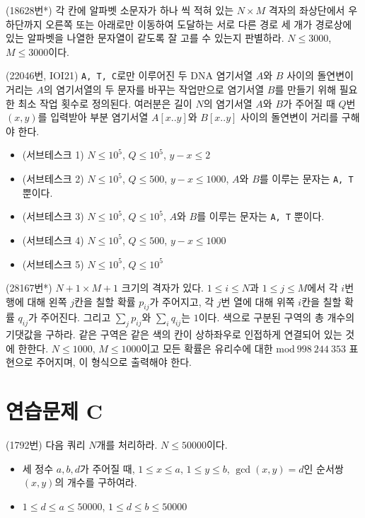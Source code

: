 \begin{problem}
    (18628번*) 각 칸에 알파벳 소문자가 하나 씩 적혀 있는 $N \times M$ 격자의 좌상단에서 우하단까지 오른쪽 또는 아래로만 이동하여 도달하는 서로 다른 경로 세 개가 경로상에 있는 알파벳을 나열한 문자열이 같도록 잘 고를 수 있는지 판별하라. $N \leq 3000$, $M \leq 3000$이다.
\end{problem}

\begin{problem}
    (22046번, IOI21) \texttt{A, T, C}로만 이루어진 두 DNA 염기서열 $A$와 $B$ 사이의 돌연변이 거리는 $A$의 염기서열의 두 문자를 바꾸는 작업만으로 염기서열 $B$를 만들기 위해 필요한 최소 작업 횟수로 정의된다. 여러분은 길이 $N$의 염기서열 $A$와 $B$가 주어질 때 $Q$번 $(x, y)$를 입력받아 부분 염기서열 $A[x..y]$와 $B[x..y]$ 사이의 돌연변이 거리를 구해야 한다.
    \begin{itemize}
        \item (서브테스크 1) $N \leq 10^5$, $Q \leq 10^5$, $y - x \leq 2$
        \item (서브테스크 2) $N \leq 10^5$, $Q \leq 500$, $y - x \leq 1000$, $A$와 $B$를 이루는 문자는 \texttt{A, T} 뿐이다.
        \item (서브테스크 3) $N \leq 10^5$, $Q \leq 10^5$, $A$와 $B$를 이루는 문자는 \texttt{A, T} 뿐이다.
        \item (서브테스크 4) $N \leq 10^5$, $Q \leq 500$, $y - x \leq 1000$
        \item (서브테스크 5) $N \leq 10^5$, $Q \leq 10^5$
    \end{itemize}
\end{problem}

\begin{problem}
    (28167번*) $N+1 \times M+1$ 크기의 격자가 있다. $1 \leq i \leq N$과 $1 \leq j \leq M$에서 각 $i$번 행에 대해 왼쪽 $j$칸을 칠할 확률 $p_{ij}$가 주어지고, 각 $j$번 열에 대해 위쪽 $i$칸을 칠할 확률 $q_{ij}$가 주어진다. 그리고 $\sum_j p_{ij}$와 $\sum_i q_{ij}$는 $1$이다.
    색으로 구분된 구역의 총 개수의 기댓값을 구하라. 같은 구역은 같은 색의 칸이 상하좌우로 인접하게 연결되어 있는 것에 한한다. $N \leq 1000$, $M \leq 1000$이고 모든 확률은 유리수에 대한 $\textrm{mod}~998~244~353$ 표현으로 주어지며, 이 형식으로 출력해야 한다.
\end{problem}

\section{연습문제 C}
\begin{problem}
    (1792번) 다음 쿼리 $N$개를 처리하라. $N \leq 50000$이다.
    \begin{itemize}
        \item 세 정수 $a, b, d$가 주어질 때, $1 \leq x \leq a$, $1 \leq y \leq b$, $\gcd(x, y)=d$인 순서쌍 $(x, y)$의 개수를 구하여라.
        \item $1 \leq d \leq a \leq 50000$, $1 \leq d \leq b \leq 50000$
    \end{itemize}
\end{problem}

